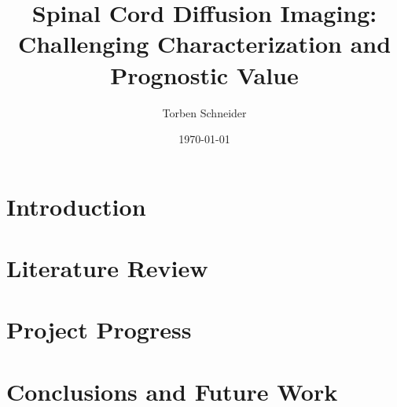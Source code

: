 \documentclass[a4paper]{scrreprt}
\begin{document}
 
\title{Spinal Cord Diffusion Imaging: Challenging Characterization and Prognostic Value} 
\date{\today} 
\author{Torben Schneider} 
\maketitle 


\chapter{Introduction} 
\chapter{Literature Review} 
\chapter{Project Progress}
 
\chapter{Conclusions and Future Work}
\end{document}

